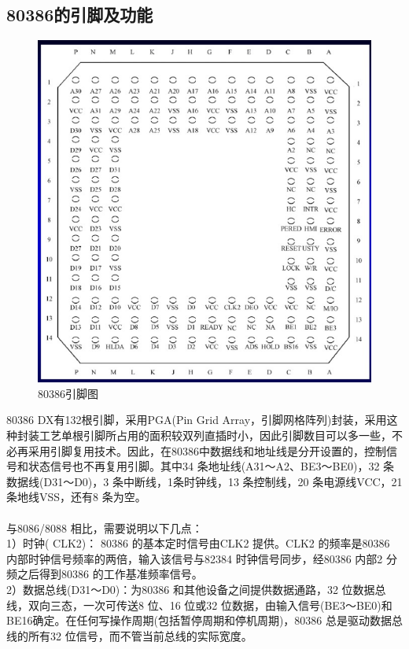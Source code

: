 \documentclass[12pt]{article}
\begin{document}
\subsection{80386的引脚及功能}
\begin{figure}[htbp]
\centering
\includegraphics[scale=0.4]{fig/21.png}
\caption{80386引脚图}
\label{fig:Intel CPU 80386}
\end{figure}
80386 DX有132根引脚，采用PGA(Pin Grid Array，引脚网格阵列)封装，采用这种封装工艺单根引脚所占用的面积较双列直插时小，因此引脚数目可以多一些，不必再采用引脚复用技术。因此，在80386中数据线和地址线是分开设置的，控制信号和状态信号也不再复用引脚。其中34 条地址线(A31～A2、BE3～BE0)，32 条数据线(D31～D0)，3 条中断线，1条时钟线，13 条控制线，20 条电源线VCC，21条地线VSS，还有8 条为空。\\\\
与8086/8088 相比，需要说明以下几点：\\
1）时钟( CLK2)： 80386 的基本定时信号由CLK2 提供。CLK2 的频率是80386 内部时钟信号频率的两倍，输入该信号与82384 时钟信号同步，经80386 内部2 分频之后得到80386 的工作基准频率信号。\\
2）数据总线(D31～D0)：为80386 和其他设备之间提供数据通路，32 位数据总线，双向三态，一次可传送8 位、16 位或32 位数据，由输入信号(BE3～BE0)和BE16确定。在任何写操作周期(包括暂停周期和停机周期)，80386 总是驱动数据总线的所有32 位信号，而不管当前总线的实际宽度。\\
\end{document}
